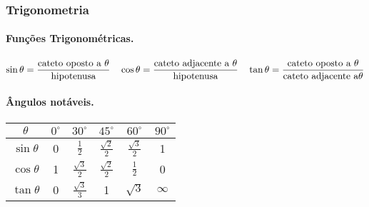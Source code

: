 \subsubsection{Trigonometria}
\paragraph{Funções Trigonométricas.}
	$$\sin\theta = \frac{\textnormal{cateto oposto a }\theta}{\textnormal{hipotenusa}}  \quad \cos\theta = \frac{\textnormal{cateto adjacente a }\theta}{\textnormal{hipotenusa}} \quad \tan\theta = \frac{\textnormal{cateto oposto a }\theta}{\textnormal{cateto adjacente a}\theta}$$

\paragraph{Ângulos notáveis.}

\begin{center}
	\begin{tabular}{|c|c c c c c|}
		$\theta$ & $0^{\circ}$ & $30^{\circ}$&$45^{\circ}$&$60^{\circ}$&$90^{\circ}$ \\
		\hline
		\rule{0pt}{0.5cm}$\sin\theta$ &0&$\frac{1}{2}$&$\frac{\sqrt{2}}{2}$&$\frac{\sqrt{3}}{2}$&1 \\
		\hline
		\rule{0pt}{0.5cm}$\cos\theta$ &1&$\frac{\sqrt{3}}{2}$&$\frac{\sqrt{2}}{2}$&$\frac{1}{2}$&0 \\
		\hline
		\rule{0pt}{0.5cm}$\tan\theta$ &0&$\frac{\sqrt{3}}{3}$&1&$\sqrt{3}$&$\infty$ \\
		
	\end{tabular}
\end{center}


